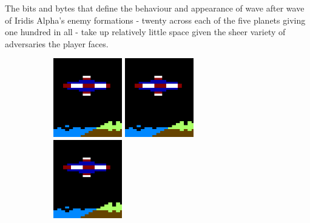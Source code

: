 The bits and bytes that define the behaviour and appearance of
wave after wave of Iridis Alpha's enemy formations - twenty across each of the
five planets giving one hundred in all - take up relatively little space given
the sheer variety of adversaries the player faces.


\begin{figure}[H]
  {
    \setlength{\tabcolsep}{3.0pt}
    \setlength\cmidrulewidth{\heavyrulewidth} %
	\begin{subfigure}{1\textwidth}
  \hspace{0.2cm}
    \includegraphics[width=3cm]{src/sprites/gallery/sprite_162.png}%
  \hspace{1.3cm}
    \includegraphics[width=3cm]{src/sprites/gallery/sprite_162.png}%
  \hspace{1.4cm}
    \includegraphics[width=3cm]{src/sprites/gallery/sprite_162.png}%
	\end{subfigure}
  }
  \vspace{1.4cm}

  {
  \setlength{\tabcolsep}{3.0pt}
  \setlength\cmidrulewidth{\heavyrulewidth} %
  \begin{adjustbox}{width=13cm}


\end{adjustbox}}
\end{figure}
